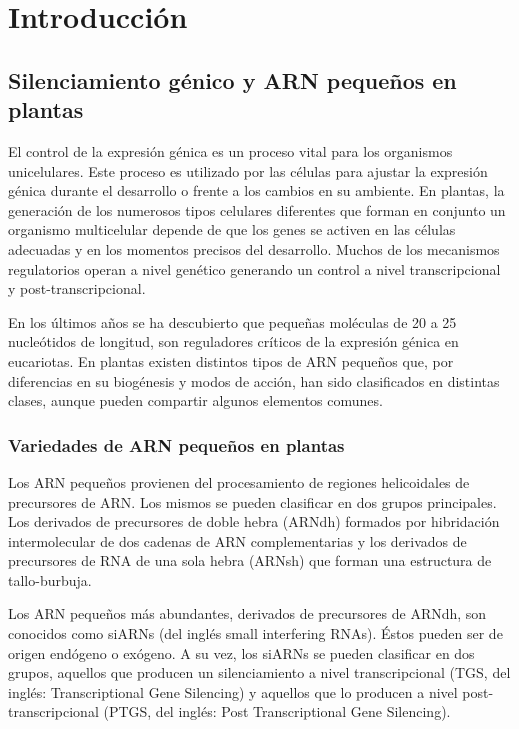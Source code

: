 \graphicspath{{Introduccion/Figs/}}

\setcounter{chapter}{1}
\chapter*{Introducción} 
\setcounter{figure}{0}
\setcounter{section}{0}

\section{Silenciamiento génico y ARN pequeños en plantas}

El control de la expresión génica es un proceso vital para los organismos unicelulares.
Este proceso es utilizado por las células para ajustar la expresión génica durante el desarrollo o frente a los cambios en su ambiente.
En plantas, la generación de los numerosos tipos celulares diferentes que forman en conjunto un organismo multicelular depende de que los genes se activen en las células adecuadas y en los momentos precisos del desarrollo.
Muchos de los mecanismos regulatorios operan a nivel genético generando un control a nivel transcripcional y post-transcripcional.

En los últimos años se ha descubierto que pequeñas moléculas de 20 a 25 nucleótidos de longitud, son reguladores críticos de la expresión génica en eucariotas.
En plantas existen distintos tipos de ARN pequeños que, por diferencias en su biogénesis y modos de acción, han sido clasificados en distintas clases, aunque pueden compartir algunos elementos comunes.

\subsection{Variedades de ARN pequeños en plantas}
Los ARN pequeños provienen del procesamiento de regiones helicoidales de precursores de ARN.
Los mismos se pueden clasificar en dos grupos principales. 
Los derivados de precursores de doble hebra (ARNdh) formados por hibridación intermolecular de dos cadenas de ARN complementarias y los derivados de precursores de RNA de una sola hebra (ARNsh) que forman una estructura de tallo-burbuja.

Los ARN pequeños más abundantes, derivados de precursores de ARNdh, son conocidos como siARNs (del inglés small interfering RNAs). 
Éstos pueden ser de origen endógeno o exógeno.
A su vez, los siARNs se pueden clasificar en dos grupos, aquellos que producen un silenciamiento a nivel transcripcional (TGS, del inglés: Transcriptional Gene Silencing) \citep{pmid17943195, Voinnet2009669} y aquellos que lo producen a nivel post-transcripcional (PTGS, del inglés: Post Transcriptional Gene Silencing)\citep{pmid10542148}.

